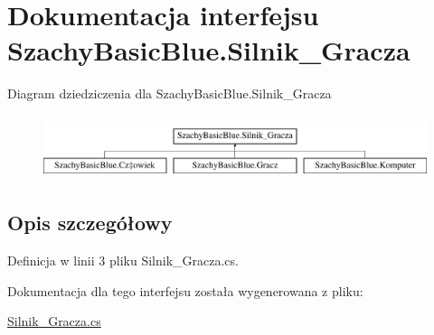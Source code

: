 \hypertarget{interface_szachy_basic_blue_1_1_silnik___gracza}{\section{Dokumentacja interfejsu Szachy\-Basic\-Blue.\-Silnik\-\_\-\-Gracza}
\label{interface_szachy_basic_blue_1_1_silnik___gracza}
}
Diagram dziedziczenia dla Szachy\-Basic\-Blue.\-Silnik\-\_\-\-Gracza\begin{figure}[H]
\begin{center}
\leavevmode
\includegraphics[height=1.866667cm]{interface_szachy_basic_blue_1_1_silnik___gracza}
\end{center}
\end{figure}


\subsection{Opis szczegółowy}


Definicja w linii 3 pliku Silnik\-\_\-\-Gracza.\-cs.



Dokumentacja dla tego interfejsu została wygenerowana z pliku\-:\begin{DoxyCompactItemize}
\item 
\hyperlink{_silnik___gracza_8cs}{Silnik\-\_\-\-Gracza.\-cs}\end{DoxyCompactItemize}
